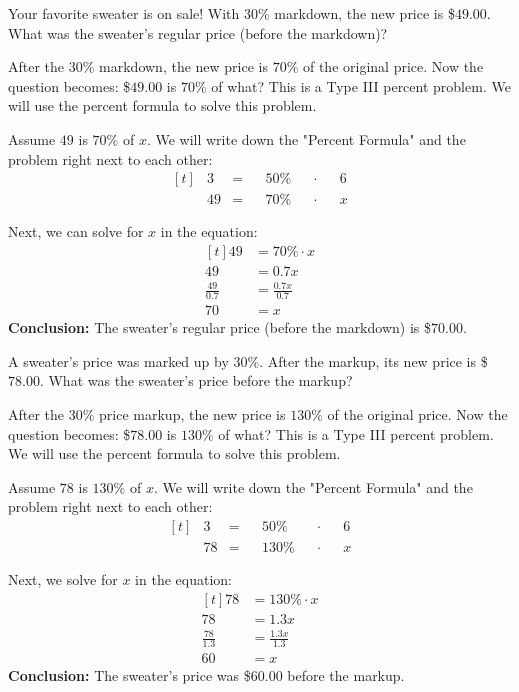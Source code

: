\begin{myexample}
Your favorite sweater is on sale! With $30\%$ markdown, the new price is \$$49.00$. What was the sweater's regular price (before the markdown)?
\end{myexample}
\begin{solution}
After the $30\%$ markdown, the new price is $70\%$ of the original price. Now the question becomes: \$$49.00$ is $70\%$ of what? This is a Type III percent problem. We will use the percent formula to solve this problem.

Assume $49$ is $70\%$ of $x$. We will write down the "Percent Formula" and the problem right next to each other:
\[
\begin{aligned}[t]
	&3 &= &&50\% &&\cdot &&6 \\
	&49 &= &&70\% &&\cdot &&x
\end{aligned}
\]

Next, we can solve for $x$ in the equation:
\[
\begin{aligned}[t]
	49 &= 70\% \cdot x \\
	49 &= 0.7x \\
	\frac{49}{0.7} &= \frac{0.7x}{0.7} \\
	70 &= x
\end{aligned}
\]
\textbf{Conclusion: } The sweater's regular price (before the markdown) is \$$70.00$.

\end{solution}

\begin{myexample}
A sweater's price was marked up by $30\%$. After the markup, its new price is \$$78.00$. What was the sweater's price before the markup?
\end{myexample}
\begin{solution}
After the $30\%$ price markup, the new price is $130\%$ of the original price. Now the question becomes: \$$78.00$ is $130\%$ of what? This is a Type III percent problem. We will use the percent formula to solve this problem.

Assume $78$ is $130\%$ of $x$. We will write down the "Percent Formula" and the problem right next to each other:
\[
\begin{aligned}[t]
	&3 &= &&50\% &&\cdot &&6 \\
	&78 &= &&130\% &&\cdot &&x
\end{aligned}
\]

Next, we solve for $x$ in the equation:
\[
\begin{aligned}[t]
	78 &= 130\% \cdot x \\
	78 &= 1.3x \\
	\frac{78}{1.3} &= \frac{1.3x}{1.3} \\
	60 &= x
\end{aligned}
\]
\textbf{Conclusion: } The sweater's price was \$$60.00$ before the markup.

\end{solution}

